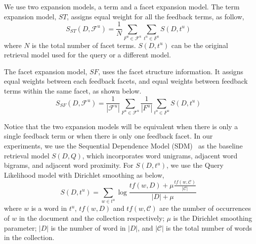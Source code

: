 We use two expansion models, a term and a facet expansion model. The term expansion model, $ST$, assigns equal weight for all the feedback terms, as follow,
\begin{equation}
S_{ST}(D,\mathcal{F}^u) = \frac{1}{N}\sum_{F^u\in\mathcal{F}^u}{\sum_{t^u\in F^u}{S(D,t^u)}}
\end{equation}
where $N$ is the total number of facet terms. $S(D,t^u)$ can be the original retrieval model used for the query or a different model.

The facet expansion model, $SF$, uses the facet structure information. It assigns equal weights between each feedback facets, and equal weights between feedback terms within the same facet, as shown below.
\begin{equation}
S_{SF}(D,\mathcal{F}^u) = \frac{1}{|\mathcal{F}^u|} \sum_{F^u \in \mathcal{F}^u}{ \frac{1}{|F^u|} \sum_{t^u \in F^u}{S(D, t^u)}}
\end{equation}

Notice that the two expansion models will be equivalent when there is only a single feedback term or when there is only one feedback facet. In our experiments, we use the Sequential Dependence Model (SDM)~\cite{metzler2005markov} as the baseline retrieval model $S(D,Q)$, which incorporates word unigrams, adjacent word bigrams, and adjacent word proximity. For $S(D,t^u)$, we use the Query Likelihood model with Dirichlet smoothing as below,
\begin{equation}
S(D,t^u)=\sum_{w\in t^u}{\log\frac{tf(w,D)+\mu\frac{tf(w,\mathcal{C})}{|\mathcal{C}|}}{|D|+\mu}}
\end{equation}
where $w$ is a word in $t^u$, $tf(w,D)$ and $tf(w,\mathcal{C})$ are the number of occurrences of $w$ in the document and the collection respectively; $\mu$ is the Dirichlet smoothing parameter; $|D|$ is the number of word in $|D|$, and $|\mathcal{C}|$ is the total number of words in the collection.

